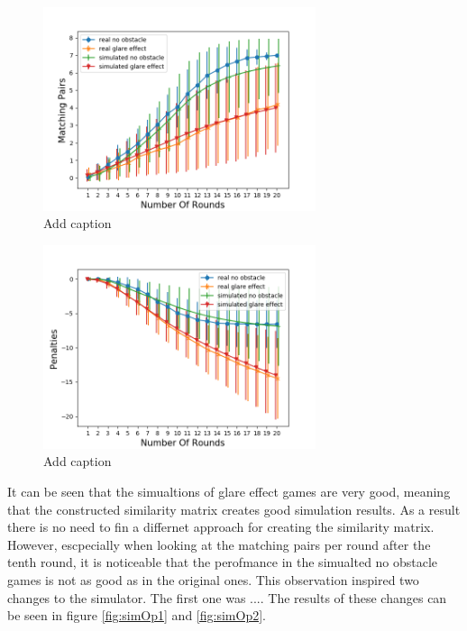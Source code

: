 \begin{minipage}{0.5\textwidth}
	\begin{figure}[H]
		\centering
		\includegraphics[width=8cm]{images/simulationInitial1.png}
		\caption[Bild kurz]{Add caption}
		\label{fig:simIn1}
	\end{figure}
\end{minipage}
\begin{minipage}{0.5\textwidth}
	\begin{figure}[H]
		\centering
		\includegraphics[width=8cm]{images/simulationInitial2.png}
		\caption[Bild kurz]{Add caption}
		\label{fig:simIn2}
	\end{figure}
\end{minipage}

It can be seen that the simualtions of glare effect games are very good, meaning that the constructed similarity matrix creates good simulation results. As a result there is no need to fin a differnet approach for creating the similarity matrix. However, escpecially when looking at the matching pairs per round after the tenth round, it is noticeable that the perofmance in the simualted no obstacle games is not as good as in the original ones. This observation inspired two changes to the simulator. The first one was .... The results of these changes can be seen in figure \ref{fig:simOp1} and \ref{fig:simOp2}.

